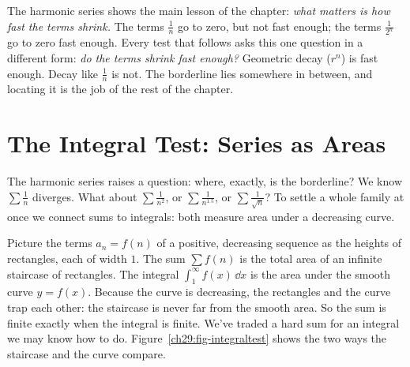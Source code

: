 \begin{aestheticbox}
The harmonic series shows the main lesson of the chapter: \emph{what matters is how fast the terms shrink.} The terms $\tfrac1n$ go to zero, but not fast enough; the terms $\tfrac{1}{2^n}$ go to zero fast enough. Every test that follows asks this one question in a different form: \emph{do the terms shrink fast enough?} Geometric decay ($r^n$) is fast enough. Decay like $\tfrac1n$ is not. The borderline lies somewhere in between, and locating it is the job of the rest of the chapter.
\end{aestheticbox}

\section{The Integral Test: Series as Areas}
\label{ch29:integral-test}

The harmonic series raises a question: where, exactly, is the borderline? We know $\sum \tfrac1n$ diverges. What about $\sum \tfrac{1}{n^2}$, or $\sum \tfrac{1}{n^{1.5}}$, or $\sum \tfrac{1}{\sqrt n}$? To settle a whole family at once we connect sums to integrals: both measure area under a decreasing curve.

\begin{intuitionbox}
Picture the terms $a_n = f(n)$ of a positive, decreasing sequence as the heights of rectangles, each of width $1$. The sum $\sum f(n)$ is the total area of an infinite staircase of rectangles. The integral $\int_1^\infty f(x)\,\dd x$ is the area under the smooth curve $y=f(x)$. Because the curve is decreasing, the rectangles and the curve trap each other: the staircase is never far from the smooth area. So the sum is finite exactly when the integral is finite. We've traded a hard sum for an integral we may know how to do. Figure~\ref{ch29:fig-integraltest} shows the two ways the staircase and the curve compare.
\end{intuitionbox}

